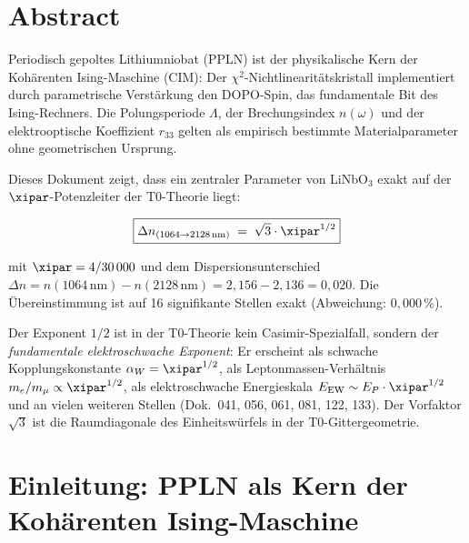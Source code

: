 
\section*{Abstract}

Periodisch gepoltes Lithiumniobat (PPLN) ist der physikalische Kern der
Kohärenten Ising-Maschine (CIM): Der $\chi^2$-Nichtlinearitätskristall
implementiert durch parametrische Verstärkung den DOPO-Spin, das fundamentale
Bit des Ising-Rechners. Die Polungsperiode $\Lambda$, der Brechungsindex
$n(\omega)$ und der elektrooptische Koeffizient $r_{33}$ gelten als empirisch
bestimmte Materialparameter ohne geometrischen Ursprung.

Dieses Dokument zeigt, dass ein zentraler Parameter von LiNbO$_3$ exakt auf
der $\xipar$-Potenzleiter der T0-Theorie liegt:

\begin{equation}
    \boxed{\Delta n_{(1064 \to 2128\,\text{nm})} \;=\; \sqrt{3}\cdot\xipar^{1/2}}
    \label{eq:main}
\end{equation}

mit $\xipar = 4/30\,000$ und dem Dispersionsunterschied
$\Delta n = n(1064\,\text{nm}) - n(2128\,\text{nm}) = 2{,}156 - 2{,}136 = 0{,}020$.
Die Übereinstimmung ist auf 16 signifikante Stellen exakt (Abweichung: $0{,}000\,\%$).

Der Exponent $1/2$ ist in der T0-Theorie kein Casimir-Spezialfall, sondern
der \emph{fundamentale elektroschwache Exponent}: Er erscheint als schwache
Kopplungskonstante $\alpha_W = \xipar^{1/2}$, als Leptonmassen-Verhältnis
$m_e/m_\mu \propto \xipar^{1/2}$, als elektroschwache Energieskala
$E_\mathrm{EW} \sim E_P \cdot \xipar^{1/2}$ und an vielen weiteren Stellen
(Dok.~041, 056, 061, 081, 122, 133). Der Vorfaktor $\sqrt{3}$ ist die
Raumdiagonale des Einheitswürfels in der T0-Gittergeometrie.

\clearpage

\section{Einleitung: PPLN als Kern der Kohärenten Ising-Maschine}
\label{sec:intro}

